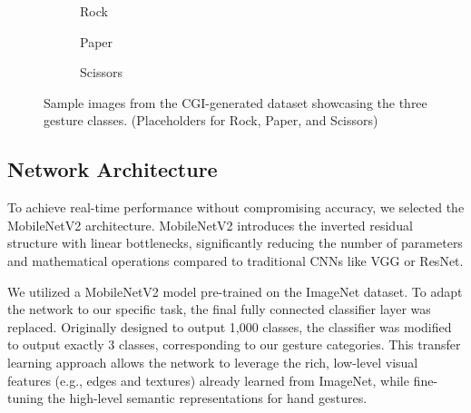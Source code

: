 \documentclass[conference]{IEEEtran}
\begin{document}
\begin{figure}[htbp]
\centering
\begin{subfigure}[b]{0.3\linewidth}
    \centering
    \framebox[\linewidth]{\rule{0pt}{2.5cm}}
    \caption{Rock}
    \label{fig:rock}
\end{subfigure}
\hfill
\begin{subfigure}[b]{0.3\linewidth}
    \centering
    \framebox[\linewidth]{\rule{0pt}{2.5cm}}
    \caption{Paper}
    \label{fig:paper}
\end{subfigure}
\hfill
\begin{subfigure}[b]{0.3\linewidth}
    \centering
    \framebox[\linewidth]{\rule{0pt}{2.5cm}}
    \caption{Scissors}
    \label{fig:scissors}
\end{subfigure}
\caption{Sample images from the CGI-generated dataset showcasing the three gesture classes. (Placeholders for Rock, Paper, and Scissors)}
\label{fig:dataset_samples}
\end{figure}

\subsection{Network Architecture}
To achieve real-time performance without compromising accuracy, we selected the MobileNetV2 architecture. MobileNetV2 introduces the inverted residual structure with linear bottlenecks, significantly reducing the number of parameters and mathematical operations compared to traditional CNNs like VGG or ResNet. 

We utilized a MobileNetV2 model pre-trained on the ImageNet dataset. To adapt the network to our specific task, the final fully connected classifier layer was replaced. Originally designed to output 1,000 classes, the classifier was modified to output exactly 3 classes, corresponding to our gesture categories. This transfer learning approach allows the network to leverage the rich, low-level visual features (e.g., edges and textures) already learned from ImageNet, while fine-tuning the high-level semantic representations for hand gestures.
\end{document}
